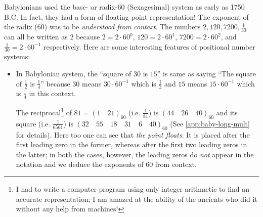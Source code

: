 Babylonians used the base- or radix-60 (Sexagesimal) system as early as 1750 {\tiny B.C.} In fact, they had a form of floating point representation! The exponent of the radix (60) was to be \textit{understood from context}. The numbers $2,120,7200,\frac{1}{30}$ can all be written as $2$ because $2=2\cdot 60^0$, $120=2\cdot 60^1$, $7200=2\cdot 60^2$, and $\frac{1}{30}=2\cdot 60^{-1}$ respectively. Here are some interesting features of positional number systems:
\begin{itemize}
\item In Babylonian system, the ``square of $30$ is $15$'' is same as saying ``The square of $\frac{1}{2}$ is $\frac{1}{4}$'' because $30$ means $30\cdot60^{-1}$ which is $\frac{1}{2}$ and $15$ means $15\cdot60^{-1}$ which is $\frac{1}{4}$ in this context.

The reciprocal\footnote{I had to write a computer program using only integer arithmetic to find an accurate representation; I am amazed at the ability of the ancients who did it without any help from machines!} of $81=(1\quad 21)_{60}$ (i.e. $\frac{1}{81}$) is $(44\quad 26\quad 40)_{60}$ and its square (i.e. $\frac{1}{6561}$) is $(32\quad 55\quad 18\quad 31\quad 6\quad 40)_{60}$ (See \ref{app:baby-long-mult} for details). Here too one can see that \textit{the point floats}: It is placed after the first leading zero in the former, whereas after the first two leading zeros in the latter; in both the cases, however, the leading zeros do \emph{not} appear in the notation and we deduce the exponents of 60 from context. 


\end{itemize}
